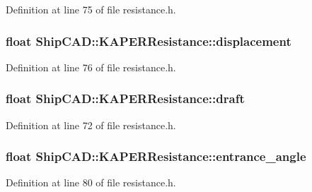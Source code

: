 Definition at line 75 of file resistance.\+h.

\subsubsection[{\texorpdfstring{displacement}{displacement}}]{\setlength{\rightskip}{0pt plus 5cm}float Ship\+C\+A\+D\+::\+K\+A\+P\+E\+R\+Resistance\+::displacement}\hypertarget{structShipCAD_1_1KAPERResistance_a5227818b90eab4991e339bbdf2e382ca}{}\label{structShipCAD_1_1KAPERResistance_a5227818b90eab4991e339bbdf2e382ca}


Definition at line 76 of file resistance.\+h.

\subsubsection[{\texorpdfstring{draft}{draft}}]{\setlength{\rightskip}{0pt plus 5cm}float Ship\+C\+A\+D\+::\+K\+A\+P\+E\+R\+Resistance\+::draft}\hypertarget{structShipCAD_1_1KAPERResistance_a0be8d3ba3d4e485abe71c462575b478a}{}\label{structShipCAD_1_1KAPERResistance_a0be8d3ba3d4e485abe71c462575b478a}


Definition at line 72 of file resistance.\+h.

\subsubsection[{\texorpdfstring{entrance\+\_\+angle}{entrance_angle}}]{\setlength{\rightskip}{0pt plus 5cm}float Ship\+C\+A\+D\+::\+K\+A\+P\+E\+R\+Resistance\+::entrance\+\_\+angle}\hypertarget{structShipCAD_1_1KAPERResistance_a941bc6efce4bc30f542cae5c68218aee}{}\label{structShipCAD_1_1KAPERResistance_a941bc6efce4bc30f542cae5c68218aee}


Definition at line 80 of file resistance.\+h.

